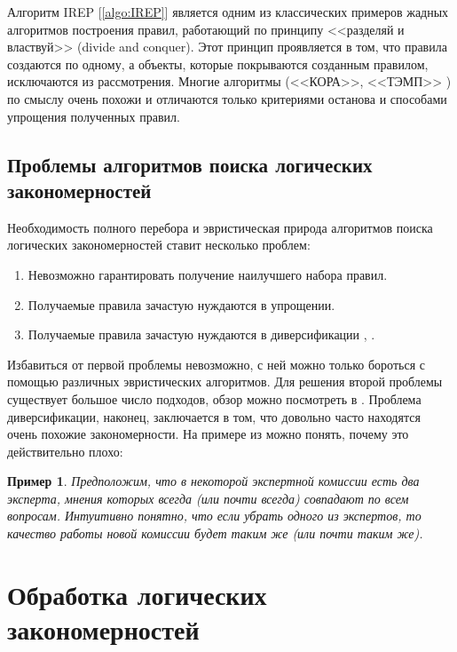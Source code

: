 \documentclass[12pt]{article}
\newtheorem{example}{Пример}
\begin{document}
Алгоритм IREP [\ref{algo:IREP}] является одним из классических примеров
жадных алгоритмов построения правил, работающий по принципу <<разделяй
и властвуй>> (divide and conquer). Этот принцип проявляется в том, что
правила создаются по одному, а объекты, которые покрываются созданным
правилом, исключаются из рассмотрения. Многие алгоритмы (<<КОРА>>,
<<ТЭМП>> \cite{voron10logicalgs}) по смыслу очень похожи и отличаются
только критериями останова и способами упрощения полученных правил.

\subsection{Проблемы алгоритмов поиска логических закономерностей}

Необходимость полного перебора и эвристическая природа алгоритмов
поиска логических закономерностей ставит несколько проблем:

\begin{enumerate}
\item Невозможно гарантировать получение наилучшего набора правил.
\item Получаемые правила зачастую нуждаются в упрощении.
\item Получаемые правила зачастую нуждаются в диверсификации
  \cite{voron10logicalgs}, \cite{vainzvaig75voting}.
\end{enumerate}

Избавиться от первой проблемы невозможно, с ней можно только бороться
с помощью различных эвристических алгоритмов. Для решения второй
проблемы существует большое число подходов, обзор можно посмотреть в
\cite{furnkranz97pruning}. Проблема диверсификации, наконец,
заключается в том, что довольно часто находятся очень похожие
закономерности. На примере из \cite{voron10logicalgs} можно понять,
почему это действительно плохо:

\begin{example}
  Предположим, что в некоторой экспертной комиссии есть два эксперта,
  мнения которых всегда (или почти всегда) совпадают по всем
  вопросам. Интуитивно понятно, что если убрать одного из экспертов,
  то качество работы новой комиссии будет таким же (или почти таким
  же).
\end{example}

\section{Обработка логических закономерностей}
\label{sec:processing}
\end{document}
